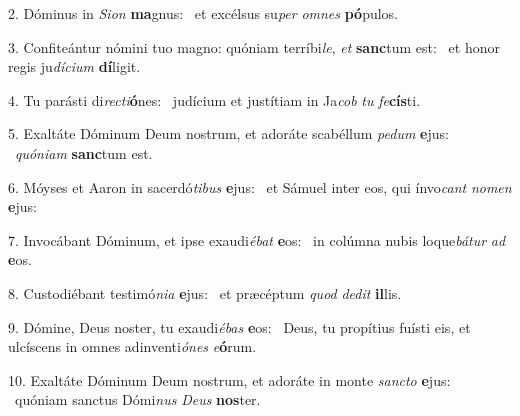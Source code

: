 2. Dóminus in \textit{Si}\textit{on} \textbf{ma}gnus: \ast\  et excélsus su\textit{per} \textit{om}\textit{nes} \textbf{pó}pulos.\

3. Confiteántur nómini tuo magno: quóniam terríbi\textit{le}, \textit{et} \textbf{sanc}tum est: \ast\  et honor regis ju\textit{dí}\textit{ci}\textit{um} \textbf{dí}ligit.\

4. Tu parásti di\textit{rec}\textit{ti}\textbf{ó}nes: \ast\  judícium et justítiam in Ja\textit{cob} \textit{tu} \textit{fe}\textbf{cís}ti.\

5. Exaltáte Dóminum Deum nostrum, et adoráte scabéllum \textit{pe}\textit{dum} \textbf{e}jus: \ast\  \textit{quón}\textit{i}\textit{am} \textbf{sanc}tum est.\

6. Móyses et Aaron in sacerdó\textit{ti}\textit{bus} \textbf{e}jus: \ast\  et Sámuel inter eos, qui ínvo\textit{cant} \textit{no}\textit{men} \textbf{e}jus:\

7. Invocábant Dóminum, et ipse exaudi\textit{é}\textit{bat} \textbf{e}os: \ast\  in colúmna nubis loque\textit{bá}\textit{tur} \textit{ad} \textbf{e}os.\

8. Custodiébant testimó\textit{ni}\textit{a} \textbf{e}jus: \ast\  et præcéptum \textit{quod} \textit{de}\textit{dit} \textbf{il}lis.\

9. Dómine, Deus noster, tu exaudi\textit{é}\textit{bas} \textbf{e}os: \ast\  Deus, tu propítius fuísti eis, et ulcíscens in omnes adinventi\textit{ó}\textit{nes} \textit{e}\textbf{ó}rum.\

10. Exaltáte Dóminum Deum nostrum, et adoráte in monte \textit{sanc}\textit{to} \textbf{e}jus: \ast\  quóniam sanctus Dómi\textit{nus} \textit{De}\textit{us} \textbf{nos}ter.\

